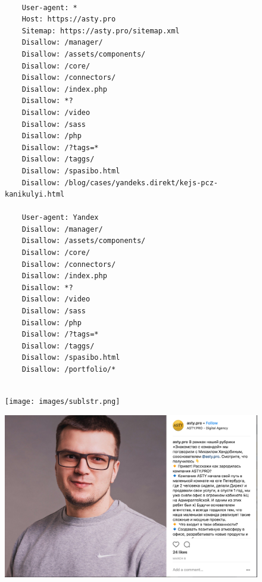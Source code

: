 \begin{figure}
	\label{robots}
	\caption{}
	
	\begin{lstlisting}
	
	User-agent: *
	Host: https://asty.pro
	Sitemap: https://asty.pro/sitemap.xml
	Disallow: /manager/
	Disallow: /assets/components/
	Disallow: /core/
	Disallow: /connectors/
	Disallow: /index.php
	Disallow: *?
	Disallow: /video
	Disallow: /sass
	Disallow: /php
	Disallow: /?tags=*
	Disallow: /taggs/
	Disallow: /spasibo.html
	Disallow: /blog/cases/yandeks.direkt/kejs-pcz-kanikulyi.html
	
	User-agent: Yandex
	Disallow: /manager/
	Disallow: /assets/components/
	Disallow: /core/
	Disallow: /connectors/
	Disallow: /index.php
	Disallow: *?
	Disallow: /video
	Disallow: /sass
	Disallow: /php
	Disallow: /?tags=*
	Disallow: /taggs/
	Disallow: /spasibo.html
	Disallow: /portfolio/*
	
	\end{lstlisting}
	
\end{figure}

\begin{figure}[ht]
	\centering
	\label{sublstr}
	\texttt{[image: images/sublstr.png]}
	\caption{}
\end{figure}


\begin{figure}[ht]
	\centering
	\label{khandobin}
	\includegraphics[width=\textwidth]{images/khandobin.png}
	\caption{}
\end{figure}

